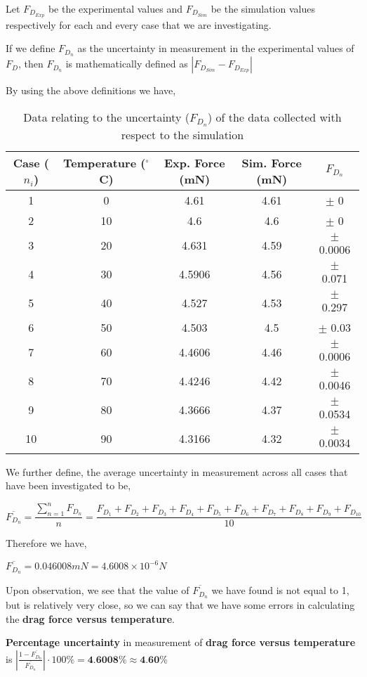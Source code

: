 {Let $F_{{D}_{Exp}}$ be the experimental values and $F_{{D}_{Sim}}$ be the simulation values respectively for each and every case that we are investigating.} 

{If we define $F_{D_n}$ as the uncertainty in measurement in the experimental values of $F_D$, then $F_{D_n}$ is mathematically defined as $\left| F_{{D}_{Sim}} - F_{{D}_{Exp}} \right|$}

{By using the above definitions we have,}

\begin{table}[H]
  \centering
  \caption{Data relating to the uncertainty ($F_{D_{n}}$) of the data collected with respect to the simulation}
    \begin{tabular}{ccccc}
    \hline
    \hline
    Case ($n_{i}$)  & Temperature ($^\circ$C)  & Exp. Force (mN) & Sim. Force (mN) & $F_{D_n}$ \\
    \hline
    \hline
    1     & 0     & 4.61  & 4.61  & $\pm$ 0 \\
    \midrule
    2     & 10    & 4.6   & 4.6   & $\pm$ 0 \\
    \midrule
    3     & 20    & 4.631 & 4.59  & $\pm$ 0.0006 \\
    \midrule
    4     & 30    & 4.5906 & 4.56  & $\pm$ 0.071 \\
    \midrule
    5     & 40    & 4.527 & 4.53  & $\pm$ 0.297 \\
    \midrule
    6     & 50    & 4.503 & 4.5   & $\pm$ 0.03 \\
    \midrule
    7     & 60    & 4.4606 & 4.46  & $\pm$ 0.0006 \\
    \midrule
    8     & 70    & 4.4246 & 4.42  & $\pm$ 0.0046 \\
    \midrule
    9     & 80    & 4.3666 & 4.37  & $\pm$ 0.0534 \\
    \midrule
    10    & 90    & 4.3166 & 4.32  & $\pm$ 0.0034 \\
    \hline
    \hline
    \end{tabular}%
  \label{tab:addlabel}%
\end{table}%

{We further define, the average uncertainty in measurement across all cases that have been investigated to be,} 

    $$\overline{F_{D_n}} = \frac{\sum_{n=1}^{n}F_{D_n}}{n} = \frac{F_{D_1} + F_{D_2} + F_{D_3} + F_{D_4} + F_{D_5} + F_{D_6} + F_{D_7} + F_{D_8} + F_{D_9} + F_{D_{10}}}{10}$$

{Therefore we have,}

    $\overline{F_{D_n}} = 0.046008 mN = 4.6008\times 10^{-6} N$

{Upon observation, we see that the value of $\overline{F_{D_n}}$ we have found is not equal to 1, but is relatively very close, so we can say that we have some errors in calculating the \textbf{drag force versus temperature}.}
        
        {\textbf{Percentage uncertainty} in measurement of \textbf{drag force versus temperature} is $\left|\frac{1-\overline{F_{D_n}}}{\overline{F_{D_n}}}\right|\cdot{100\%} = \textbf{4.6008\%} \approx \textbf{4.60\%}$}
        



